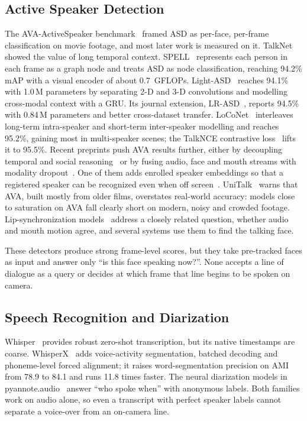 \documentclass[conference]{IEEEtran}
\begin{document}
\subsection{Active Speaker Detection}
The AVA-ActiveSpeaker benchmark~\cite{roth2020ava} framed ASD as per-face, per-frame classification on movie footage, and most later work is measured on it. TalkNet~\cite{tao2021talknet} showed the value of long temporal context. SPELL~\cite{min2022spell} represents each person in each frame as a graph node and treats ASD as node classification, reaching 94.2\% mAP with a visual encoder of about 0.7~GFLOPs. Light-ASD~\cite{liao2023lightasd} reaches 94.1\% with 1.0\,M parameters by separating 2-D and 3-D convolutions and modelling cross-modal context with a GRU. Its journal extension, LR-ASD~\cite{liao2025lrasd}, reports 94.5\% with 0.84\,M parameters and better cross-dataset transfer. LoCoNet~\cite{wang2024loconet} interleaves long-term intra-speaker and short-term inter-speaker modelling and reaches 95.2\%, gaining most in multi-speaker scenes; the TalkNCE contrastive loss~\cite{jung2023talknce} lifts it to 95.5\%. Recent preprints push AVA results further, either by decoupling temporal and social reasoning~\cite{xiao2025d2stream} or by fusing audio, face and mouth streams with modality dropout~\cite{wang2026roam}. One of them adds enrolled speaker embeddings so that a registered speaker can be recognized even when off screen~\cite{wang2026beyond}. UniTalk~\cite{nguyen2026unitalk} warns that AVA, built mostly from older films, overstates real-world accuracy: models close to saturation on AVA fall clearly short on modern, noisy and crowded footage. Lip-synchronization models~\cite{chung2016syncnet,afouras2020lwtnet,iashin2024synchformer} address a closely related question, whether audio and mouth motion agree, and several systems use them to find the talking face.

These detectors produce strong frame-level scores, but they take pre-tracked faces as input and answer only ``is this face speaking now?''. None accepts a line of dialogue as a query or decides at which frame that line begins to be spoken on camera.

\subsection{Speech Recognition and Diarization}
Whisper~\cite{radford2023whisper} provides robust zero-shot transcription, but its native timestamps are coarse. WhisperX~\cite{bain2023whisperx} adds voice-activity segmentation, batched decoding and phoneme-level forced alignment; it raises word-segmentation precision on AMI from 78.9 to 84.1 and runs 11.8 times faster. The neural diarization models in pyannote.audio~\cite{bredin2023pyannote,plaquet2023powerset} answer ``who spoke when'' with anonymous labels. Both families work on audio alone, so even a transcript with perfect speaker labels cannot separate a voice-over from an on-camera line.
\end{document}
